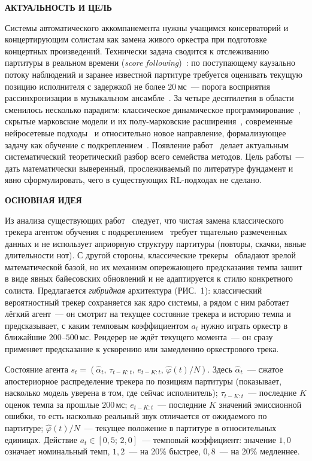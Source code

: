 \documentclass[%
  aps,pre,
  superscriptaddress,
  longbibliography,nofootinbib,
  showkeys,
  amsmath,amssymb,floatfix
]{revtex4-2}
\makeatletter
\newcommand{\seclab}[1]{\label{sec:#1}}
\newcounter{musecct}
\newcommand{\sect}[2]{%
  \par\addvspace{1.0\baselineskip}%
  \refstepcounter{musecct}%
  \begingroup
    \centering
    \normalsize\bfseries
    \MakeUppercase{#1}%
    \par
  \endgroup
  \seclab{#2}%
  \nopagebreak
  \addvspace{0.5\baselineskip}%
  \@afterindentfalse\@afterheading
  \ignorespaces}
\makeatother
\begin{document}
\sect{Актуальность и цель}{intro}
%
Системы автоматического аккомпанемента нужны учащимся
консерваторий и концертирующим солистам как замена живого
оркестра при подготовке концертных произведений. Технически
задача сводится к отслеживанию партитуры в реальном времени
(\textit{score following})~\cite{Dannenberg1984}: по поступающему
каузально потоку наблюдений и заранее известной партитуре
требуется оценивать текущую позицию исполнителя с задержкой не
более $20$\,мс~--- порога восприятия рассинхронизации в
музыкальном ансамбле~\cite{Cont2010}. За четыре десятилетия в
области сменилось несколько парадигм: классическое динамическое
программирование~\cite{SakoeChiba1978,Dixon2005}, скрытые
марковские модели и их полу-марковские
расширения~\cite{Rabiner1989,Cont2010,Nakamura2015}, современные
нейросетевые подходы~\cite{Henkel2021} и относительно новое
направление, формализующее задачу как обучение с
подкреплением~\cite{Dorfer2018RL,Peter2023,Wu2024ReaLchords}.
Появление работ~\cite{Dorfer2018RL,Peter2023,Wu2024ReaLchords}
делает актуальным систематический теоретический разбор всего
семейства методов. Цель работы~--- дать математически выверенный,
прослеживаемый по литературе фундамент и явно сформулировать,
чего в существующих RL-подходах не сделано.

\sect{Основная идея}{idea}
%
Из анализа существующих работ~\cite{Dorfer2018RL,Peter2023,
Jiang2020RLDuet,Wu2024ReaLchords,Jaques2017SeqTutor} следует, что
чистая замена классического трекера агентом обучения с
подкреплением~\cite{Dorfer2018RL} требует тщательно размеченных
данных и не использует априорную структуру партитуры (повторы,
скачки, явные длительности нот). С другой стороны, классические
трекеры~\cite{Cont2010} обладают зрелой математической базой, но
их механизм опережающего предсказания темпа зашит в виде явных
байесовских обновлений и не адаптируется к стилю конкретного
солиста. Предлагается \textit{гибридная} архитектура (РИС.~1):
классический вероятностный трекер сохраняется как ядро системы, а
рядом с ним работает лёгкий агент~--- он смотрит на текущее
состояние трекера и историю темпа и предсказывает, с каким
темповым коэффициентом $a_t$ нужно играть оркестр в ближайшие
$200$--$500$\,мс. Рендерер не ждёт текущего момента~--- он сразу
применяет предсказание к ускорению или замедлению оркестрового
трека.

Состояние агента $s_t = (\hat\alpha_t,\,\tau_{t-K:t},\,
e_{t-K:t},\,\hat\varphi(t)/N)$. Здесь $\hat\alpha_t$~--- сжатое
апостериорное распределение трекера по позициям партитуры
(показывает, насколько модель уверена в том, где сейчас
исполнитель); $\tau_{t-K:t}$~--- последние $K$ оценок темпа за
прошлые $200$\,мс; $e_{t-K:t}$~--- последние $K$ значений
эмиссионной ошибки, то есть насколько реальный звук отличается от
ожидаемого по партитуре; $\hat\varphi(t)/N$~--- текущее положение
в партитуре в относительных единицах. Действие
$a_t \in [0{,}5;\,2{,}0]$~--- темповый коэффициент: значение $1{,}0$
означает номинальный темп, $1{,}2$~--- на 20\% быстрее,
$0{,}8$~--- на 20\% медленнее.
\end{document}
